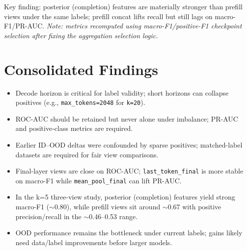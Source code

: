 \documentclass[11pt]{article}
\begin{document}
\noindent
Key finding: posterior (completion) features are materially stronger than prefill views under the same labels; prefill concat lifts recall but still lags on macro-F1/PR-AUC.
\newline
\noindent\textit{Note: metrics recomputed using macro-F1/positive-F1 checkpoint selection after fixing the aggregation selection logic.}

\section*{Consolidated Findings}
\begin{itemize}
  \item Decode horizon is critical for label validity; short horizons can collapse positives (e.g., \texttt{max\_tokens=2048} for \texttt{k=20}).
  \item ROC-AUC should be retained but never alone under imbalance; PR-AUC and positive-class metrics are required.
  \item Earlier ID--OOD deltas were confounded by sparse positives; matched-label datasets are required for fair view comparisons.
  \item Final-layer views are close on ROC-AUC; \texttt{last\_token\_final} is more stable on macro-F1 while \texttt{mean\_pool\_final} can lift PR-AUC.
  \item In the k=5 three-view study, posterior (completion) features yield strong macro-F1 ($\sim$0.80), while prefill views sit around $\sim$0.67 with positive precision/recall in the $\sim$0.46--0.53 range.
  \item OOD performance remains the bottleneck under current labels; gains likely need data/label improvements before larger models.
\end{itemize}
\end{document}
